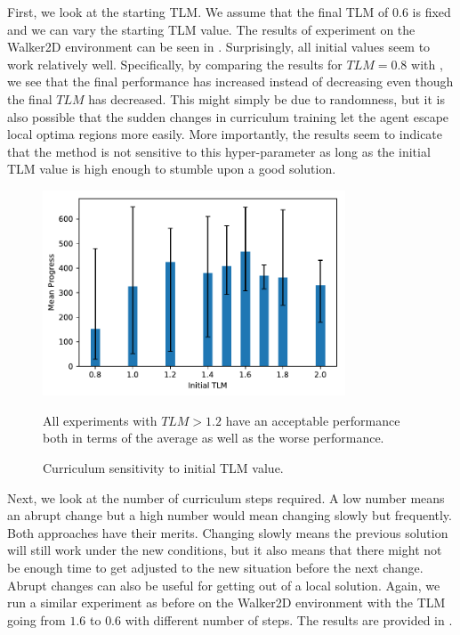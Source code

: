 First, we look at the starting \ac{TLM}. We assume that the final \ac{TLM} of $0.6$ is fixed and we can vary the starting \ac{TLM} value. The results of experiment on the Walker2D environment can be seen in . Surprisingly, all initial values seem to work relatively well. Specifically, by comparing the results for $TLM=0.8$ with , we see that the final performance has increased instead of decreasing even though the final $TLM$ has decreased. This might simply be due to randomness, but it is also possible that the sudden changes in curriculum training let the agent escape local optima regions more easily. More importantly, the results seem to indicate that the method is not sensitive to this hyper-parameter as long as the initial \ac{TLM} value is high enough to stumble upon a good solution.

\begin{figure}
    \centering
    \includegraphics[width=90mm]{img/TorqueLimit_Curr_TLM.pdf}
    \caption{Curriculum sensitivity to initial \ac{TLM} value.}{All experiments with $TLM > 1.2$ have an acceptable performance both in terms of the average as well as the worse performance.}
    \label{fig:torque_limit_hp_tlm}
\end{figure}

Next, we look at the number of curriculum steps required. A low number means an abrupt change but a high number would mean changing slowly but frequently. Both approaches have their merits. Changing slowly means the previous solution will still work under the new conditions, but it also means that there might not be enough time to get adjusted to the new situation before the next change. Abrupt changes can also be useful for getting out of a local solution. Again, we run a similar experiment as before on the Walker2D environment with the \ac{TLM} going from $1.6$ to $0.6$ with different number of steps. The results are provided in .

